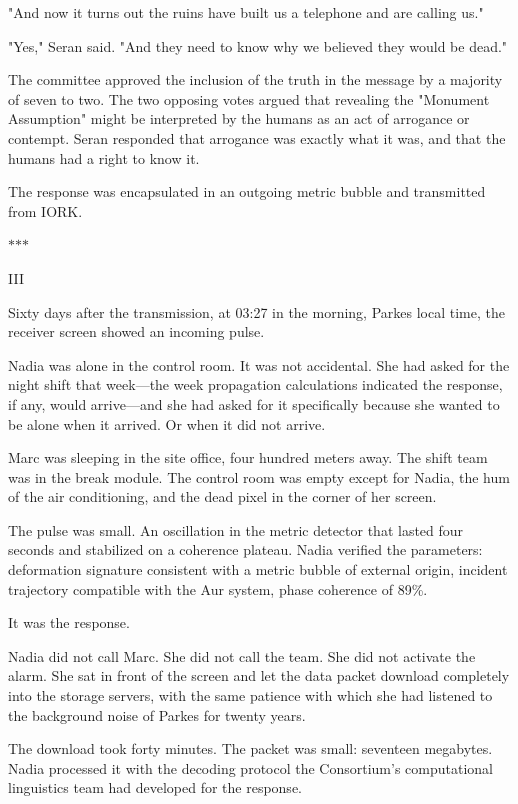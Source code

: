 \documentclass[11pt,a5paper,twoside]{book}
\begin{document}
"And now it turns out the ruins have built us a telephone and are calling us."

"Yes," Seran said. "And they need to know why we believed they would be dead."

The committee approved the inclusion of the truth in the message by a majority of seven to two. The two opposing votes argued that revealing the "Monument Assumption" might be interpreted by the humans as an act of arrogance or contempt. Seran responded that arrogance was exactly what it was, and that the humans had a right to know it.

The response was encapsulated in an outgoing metric bubble and transmitted from IORK.

\vspace{1.5em}
\begin{center}$\ast$\quad$\ast$\quad$\ast$\end{center}
\vspace{1.5em}

III

Sixty days after the transmission, at 03:27 in the morning, Parkes local time, the receiver screen showed an incoming pulse.

Nadia was alone in the control room. It was not accidental. She had asked for the night shift that week—the week propagation calculations indicated the response, if any, would arrive—and she had asked for it specifically because she wanted to be alone when it arrived. Or when it did not arrive.

Marc was sleeping in the site office, four hundred meters away. The shift team was in the break module. The control room was empty except for Nadia, the hum of the air conditioning, and the dead pixel in the corner of her screen.

The pulse was small. An oscillation in the metric detector that lasted four seconds and stabilized on a coherence plateau. Nadia verified the parameters: deformation signature consistent with a metric bubble of external origin, incident trajectory compatible with the Aur system, phase coherence of 89\%.

It was the response.

Nadia did not call Marc. She did not call the team. She did not activate the alarm. She sat in front of the screen and let the data packet download completely into the storage servers, with the same patience with which she had listened to the background noise of Parkes for twenty years.

The download took forty minutes. The packet was small: seventeen megabytes. Nadia processed it with the decoding protocol the Consortium's computational linguistics team had developed for the response.
\end{document}
